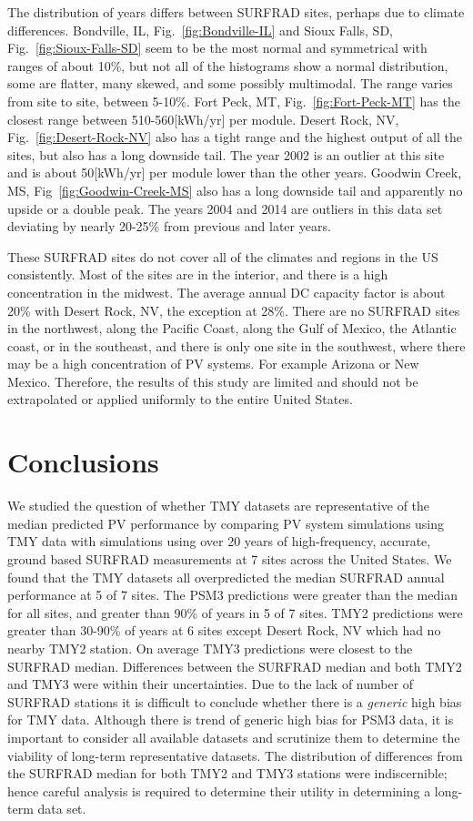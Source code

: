 \documentclass[conference]{IEEEtran}
\begin{document}
The distribution of years differs between SURFRAD sites, perhaps due to climate differences. Bondville, IL, Fig.~\ref{fig:Bondville-IL} and Sioux Falls, SD, Fig.~\ref{fig:Sioux-Falls-SD} seem to be the most normal and symmetrical with ranges of about 10\%, but not all of the histograms show a normal distribution, some are flatter, many skewed, and some possibly multimodal. The range varies from site to site, between 5-10\%. Fort Peck, MT, Fig.~\ref{fig:Fort-Peck-MT} has the closest range between 510-560[kWh/yr] per module. Desert Rock, NV, Fig.~\ref{fig:Desert-Rock-NV} also has a tight range and the highest output of all the sites, but also has a long downside tail. The year 2002 is an outlier at this site and is about 50[kWh/yr] per module lower than the other years. Goodwin Creek, MS, Fig~\ref{fig:Goodwin-Creek-MS} also has a long downside tail and apparently no upside or a double peak. The years 2004 and 2014 are outliers in this data set deviating by nearly 20-25\% from previous and later years.

These SURFRAD sites do not cover all of the climates and regions in the US consistently. Most of the sites are in the interior, and there is a high concentration in the midwest. The average annual DC capacity factor is about 20\% with Desert Rock, NV, the exception at 28\%. There are no SURFRAD sites in the northwest, along the Pacific Coast, along the Gulf of Mexico, the Atlantic coast, or in the southeast, and there is only one site in the southwest, where there may be a high concentration of PV systems. For example Arizona or New Mexico. Therefore, the results of this study are limited and should not be extrapolated or applied uniformly to the entire United States.

\section{Conclusions}
We studied the question of whether TMY datasets are representative of the median predicted PV performance by comparing PV system simulations using TMY data with simulations using over 20 years of high-frequency, accurate, ground based SURFRAD measurements at 7 sites across the United States. We found that the TMY datasets all overpredicted the median SURFRAD annual performance at 5 of 7 sites. The PSM3 predictions were greater than the median for all sites, and greater than 90\% of years in 5 of 7 sites. TMY2 predictions were greater than 30-90\% of years at 6 sites except Desert Rock, NV which had no nearby TMY2 station. On average TMY3 predictions were closest to the SURFRAD median. Differences between the SURFRAD median and both TMY2 and TMY3 were within their uncertainties. Due to the lack of number of SURFRAD stations it is difficult to conclude whether there is a \textit{generic} high bias for TMY data. Although there is trend of generic high bias for PSM3 data, it is important to consider all available datasets and scrutinize them to determine the viability of long-term representative datasets. The distribution of differences from the SURFRAD median for both TMY2 and TMY3 stations were indiscernible; hence careful analysis is required to determine their utility in determining a long-term data set.



\end{document}
